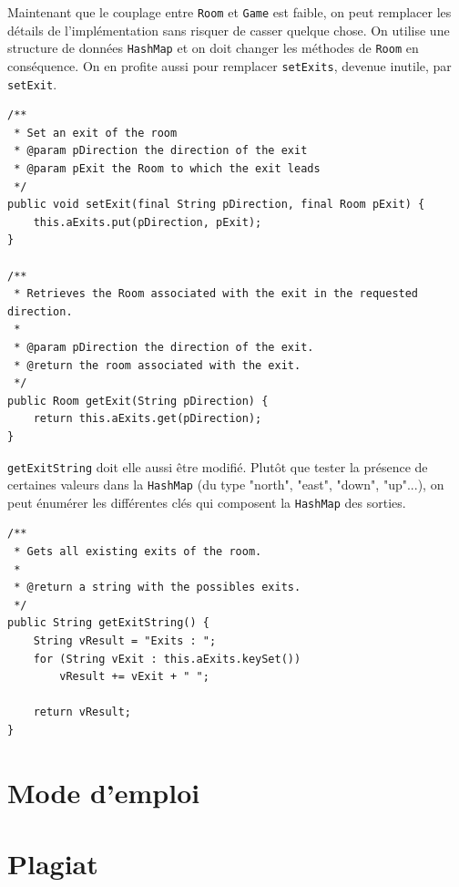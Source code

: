 \documentclass[a4paper,12pt]{report}
\begin{document}
\begin{exercise}[subtitle=HashMap et setExit]

Maintenant que le couplage entre \verb|Room| et \verb|Game| est faible, on peut remplacer les détails de l'implémentation sans risquer de casser quelque chose. On utilise une structure de données \verb|HashMap| et on doit changer les méthodes de \verb|Room| en conséquence. On en profite aussi pour remplacer \verb|setExits|, devenue inutile, par \verb|setExit|.

\vfill

\begin{verbatim}
/**
 * Set an exit of the room
 * @param pDirection the direction of the exit
 * @param pExit the Room to which the exit leads
 */
public void setExit(final String pDirection, final Room pExit) {
    this.aExits.put(pDirection, pExit);
}

/**
 * Retrieves the Room associated with the exit in the requested direction.
 *
 * @param pDirection the direction of the exit.
 * @return the room associated with the exit.
 */
public Room getExit(String pDirection) {
    return this.aExits.get(pDirection);
}
\end{verbatim}
\end{exercise}

\begin{exercise}[subtitle=keySet]

\verb|getExitString| doit elle aussi être modifié. Plutôt que tester la présence de certaines valeurs dans la \verb|HashMap| (du type "north", "east", "down", "up"...), on peut énumérer les différentes clés qui composent la \verb|HashMap| des sorties.

\begin{verbatim}
/**
 * Gets all existing exits of the room.
 *
 * @return a string with the possibles exits.
 */
public String getExitString() {
    String vResult = "Exits : ";
    for (String vExit : this.aExits.keySet())
        vResult += vExit + " ";

    return vResult;
}
\end{verbatim}
\end{exercise}

\chapter{Mode d'emploi}

\chapter{Plagiat}
\end{document}
